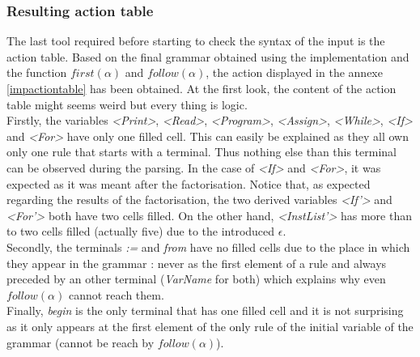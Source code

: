 \documentclass[a4paper,11pt]{article}
\begin{document}
    \subsubsection{Resulting action table}
      The last tool required before starting to check the syntax of the input is the action table. Based on the final grammar obtained using the implementation and the function $first(\alpha)$ and $follow(\alpha)$, the action displayed in the annexe \ref{impactiontable} has been obtained. At the first look, the content of the action table might seems weird but every thing is logic.\\
      Firstly, the variables \textit{<Print>}, \textit{<Read>}, \textit{<Program>}, \textit{<Assign>}, \textit{<While>}, \textit{<If>} and \textit{<For>} have only one filled cell. This can easily be explained as they all own only one rule that starts with a terminal. Thus nothing else than this terminal can be observed during the parsing. In the case of \textit{<If>} and \textit{<For>}, it was expected as it was meant after the factorisation. Notice that, as expected regarding the results of the factorisation, the two derived variables \textit{<If'>} and \textit{<For'>} both have two cells filled. On the other hand, \textit{<InstList'>} has more than to two cells filled (actually five) due to the introduced $\epsilon$.\\
      Secondly, the terminals \textit{:=} and \textit{from} have no filled cells due to the place in which they appear in the grammar : never as the first element of a rule and always preceded by an other terminal (\textit{VarName} for both) which explains why even $follow(\alpha)$ cannot reach them.\\
      Finally, \textit{begin} is the only terminal that has one filled cell and it is not surprising as it only appears at the first element of the only rule of the initial variable of the grammar (cannot be reach by $follow(\alpha)$).
    
\end{document}
